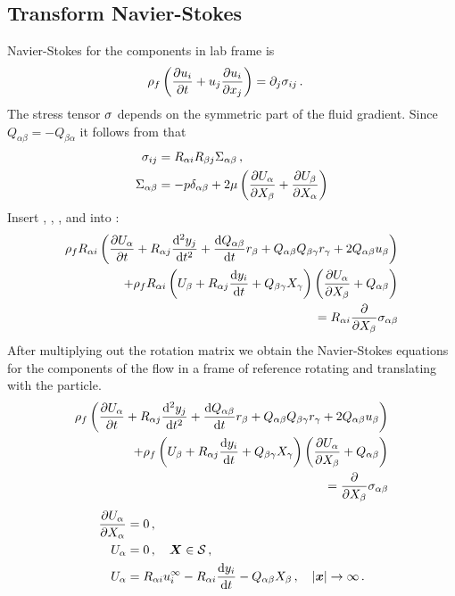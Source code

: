 \documentclass[thesis.tex]{subfiles}
\begin{document}
\subsection{Transform Navier-Stokes}
Navier-Stokes for the components in lab frame is
\begin{align}
    \rho_f\left(\pdiff{u_i}{t} + u_j\pdiff{u_i}{x_j}\right) &= \partial_j \sigma_{ij}\,.\eqnlab{nslab}
\end{align}
The stress tensor $\mathbb{\sigma}$ depends on the symmetric part of the fluid gradient. Since $Q_{\alpha \beta}=-Q_{\beta \alpha}$ it follows from  that
\begin{align}
	\sigma_{ij} &= R_{\alpha i}R_{\beta j}\Sigma_{\alpha \beta}\,,\nn\\
	\Sigma_{\alpha \beta} &= -p \delta_{\alpha \beta} + 2\mu \left(\pdiff{U_\alpha}{X_\beta}+\pdiff{U_\beta}{X_\alpha}\right)\eqnlab{sigma_particle}
\end{align}
Insert , , , and  into :
\begin{align}
	\rho_f R_{\alpha i}\left(\frac{\partial U_\alpha}{\partial t} + R_{\alpha j}\frac{\mathrm{d}^2y_j}{\mathrm{d} t^2} + \frac{\mathrm{d} Q_{\alpha \beta}}{\mathrm{d} t}r_\beta + Q_{\alpha \beta}Q_{\beta \gamma}r_\gamma + 2Q_{\alpha \beta}u_\beta \right) \nonumber \\
	+ \rho_f R_{\alpha i}\left(U_\beta + R_{\alpha j}\frac{\mathrm{d} y_i}{\mathrm{d} t}+Q_{\beta \gamma}X_\gamma\right)\left(\frac{\partial U_\alpha}{\partial X_\beta}+Q_{\alpha \beta}\right) \nonumber \\
	= R_{\alpha i}\frac{\partial }{\partial X_\beta} \sigma_{\alpha \beta}
\end{align}
After multiplying out the rotation matrix we obtain the Navier-Stokes equations for the components of the flow in a frame of reference rotating and translating with the particle.
\begin{align}
	\rho_f \left(\frac{\partial U_\alpha}{\partial t} + R_{\alpha j}\frac{\mathrm{d}^2y_j}{\mathrm{d} t^2} + \frac{\mathrm{d} Q_{\alpha \beta}}{\mathrm{d} t}r_\beta + Q_{\alpha \beta}Q_{\beta \gamma}r_\gamma + 2Q_{\alpha \beta}u_\beta \right) \nonumber \\
	+ \rho_f \left(U_\beta + R_{\alpha j}\frac{\mathrm{d} y_i}{\mathrm{d} t}+Q_{\beta \gamma}X_\gamma\right)\left(\frac{\partial U_\alpha}{\partial X_\beta}+Q_{\alpha \beta}\right) \nonumber \\
	= \frac{\partial }{\partial X_\beta} \sigma_{\alpha \beta}
\end{align}
\begin{align}
	\frac{\partial U_\alpha}{\partial X_\alpha} &= 0\,, \\
	U_\alpha &= 0\,,\quad \mbox{\boldmath$X$} \in \mathcal S\,, \\
	U_\alpha &= R_{\alpha i}u^\infty_i - R_{\alpha i}\frac{\mathrm{d} y_i}{\mathrm{d} t} - Q_{\alpha \beta} X_\beta\,,\quad|\mbox{\boldmath$x$}|\to\infty\,.
\end{align}
\end{document}
